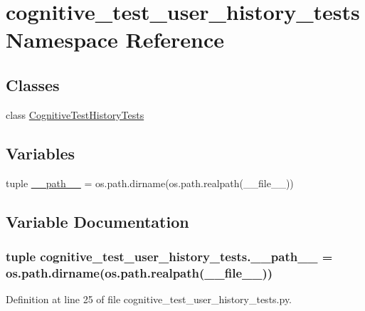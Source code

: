 \hypertarget{namespacecognitive__test__user__history__tests}{\section{cognitive\-\_\-test\-\_\-user\-\_\-history\-\_\-tests Namespace Reference}
\label{namespacecognitive__test__user__history__tests}
}
\subsection*{Classes}
\begin{DoxyCompactItemize}
\item 
class \hyperlink{classcognitive__test__user__history__tests_1_1CognitiveTestHistoryTests}{Cognitive\-Test\-History\-Tests}
\end{DoxyCompactItemize}
\subsection*{Variables}
\begin{DoxyCompactItemize}
\item 
tuple \hyperlink{namespacecognitive__test__user__history__tests_ae0914542ff16e02988b32e0ea06c87c3}{\-\_\-\-\_\-path\-\_\-\-\_\-} = os.\-path.\-dirname(os.\-path.\-realpath(\-\_\-\-\_\-file\-\_\-\-\_\-))
\end{DoxyCompactItemize}


\subsection{Variable Documentation}
\hypertarget{namespacecognitive__test__user__history__tests_ae0914542ff16e02988b32e0ea06c87c3}{
\subsubsection[{\-\_\-\-\_\-path\-\_\-\-\_\-}]{\setlength{\rightskip}{0pt plus 5cm}tuple cognitive\-\_\-test\-\_\-user\-\_\-history\-\_\-tests.\-\_\-\-\_\-path\-\_\-\-\_\- = os.\-path.\-dirname(os.\-path.\-realpath(\-\_\-\-\_\-file\-\_\-\-\_\-))}}\label{namespacecognitive__test__user__history__tests_ae0914542ff16e02988b32e0ea06c87c3}


Definition at line 25 of file cognitive\-\_\-test\-\_\-user\-\_\-history\-\_\-tests.\-py.


